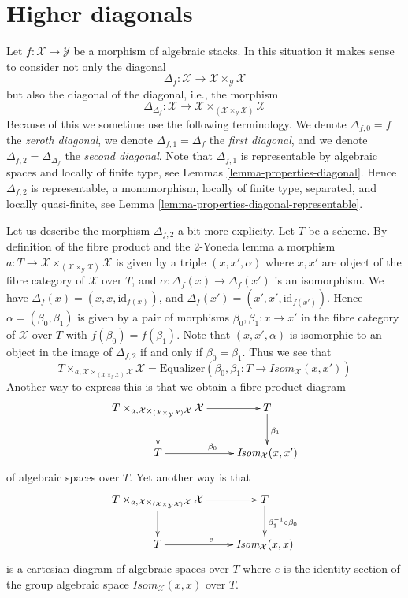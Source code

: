 \section{Higher diagonals}
\label{section-higher-diagonals}

\noindent
Let $f : \mathcal{X} \to \mathcal{Y}$ be a morphism of algebraic stacks.
In this situation it makes sense to consider not only the diagonal
$$
\Delta_f : \mathcal{X} \to \mathcal{X} \times_{\mathcal{Y}} \mathcal{X}
$$
but also the diagonal of the diagonal, i.e., the morphism
$$
\Delta_{\Delta_f} :
\mathcal{X}
\longrightarrow
\mathcal{X} \times_{(\mathcal{X} \times_{\mathcal{Y}} \mathcal{X})} \mathcal{X}
$$
Because of this we sometime use the following terminology. We denote
$\Delta_{f, 0} = f$ the {\it zeroth diagonal},
we denote $\Delta_{f, 1} = \Delta_f$ the {\it first diagonal}, and
we denote $\Delta_{f, 2} = \Delta_{\Delta_f}$ the {\it second diagonal}.
Note that $\Delta_{f, 1}$ is representable by algebraic spaces and locally of
finite type, see
Lemmas \ref{lemma-properties-diagonal}.
Hence $\Delta_{f, 2}$ is representable, a monomorphism, locally of finite type,
separated, and locally quasi-finite, see
Lemma \ref{lemma-properties-diagonal-representable}.

\medskip\noindent
Let us describe the morphism $\Delta_{f, 2}$ a bit more explicity.
Let $T$ be a scheme. By definition of the fibre product and the
$2$-Yoneda lemma a morphism
$a : T \to \mathcal{X}
\times_{(\mathcal{X} \times_{\mathcal{Y}} \mathcal{X})} \mathcal{X}$
is given by a triple $(x, x', \alpha)$ where $x, x'$ are object of the
fibre category of $\mathcal{X}$ over $T$, and
$\alpha : \Delta_f(x) \to \Delta_f(x')$ is an isomorphism. We have
$\Delta_f(x) = (x, x, \text{id}_{f(x)})$, and
$\Delta_f(x') = (x', x', \text{id}_{f(x')})$. Hence
$\alpha = (\beta_0, \beta_1)$ is given by a pair of morphisms
$\beta_0, \beta_1 : x \to x'$ in the fibre category of $\mathcal{X}$ over $T$
with $f(\beta_0) = f(\beta_1)$. Note that $(x, x', \alpha)$ is
isomorphic to an object in the image of $\Delta_{f, 2}$ if and only if
$\beta_0 = \beta_1$. Thus we see that
$$
T \times_{a, \mathcal{X}
\times_{(\mathcal{X} \times_{\mathcal{Y}} \mathcal{X})} \mathcal{X}}
\mathcal{X}
= \text{Equalizer}(
\beta_0, \beta_1 : T \longrightarrow \textit{Isom}_{\mathcal{X}}(x, x')
)
$$
Another way to express this is that
we obtain a fibre product diagram
$$
\xymatrix{
T \times_{a, \mathcal{X}
\times_{(\mathcal{X} \times_{\mathcal{Y}} \mathcal{X})} \mathcal{X}}
\mathcal{X} \ar[d] \ar[r] &
T \ar[d]^{\beta_1} \\
T \ar[r]^{\beta_0} &
\textit{Isom}_{\mathcal{X}}(x, x')
}
$$
of algebraic spaces over $T$. Yet another way is that
$$
\xymatrix{
T \times_{a, \mathcal{X}
\times_{(\mathcal{X} \times_{\mathcal{Y}} \mathcal{X})} \mathcal{X}}
\mathcal{X} \ar[d] \ar[r] &
T \ar[d]^{\beta_1^{-1} \circ \beta_0} \\
T \ar[r]^e &
\textit{Isom}_{\mathcal{X}}(x, x)
}
$$
is a cartesian diagram of algebraic spaces over $T$ where $e$ is the
identity section of the group algebraic space
$\textit{Isom}_{\mathcal{X}}(x, x)$ over $T$.

